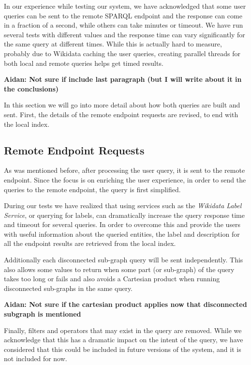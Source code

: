 In our experience while testing our system, we have acknowledged that some user queries can be sent to the remote SPARQL endpoint and the response can come in a fraction of a second, while others can take minutes or timeout. 
We have run several tests with different values and the response time can vary significantly for the same query at different times. While this is actually hard to measure, probably due to Wikidata caching the user queries, creating parallel threads for both local and remote queries helps get timed results.

\textbf{Aidan: Not sure if include last paragraph (but I will write about it in the conclusions)}

In this section we will go into more detail about how both queries are built and sent. First, the details of the remote endpoint requests are revised, to end with the local index.

\subsection{Remote Endpoint Requests}

As was mentioned before, after processing the user query, it is sent to the remote endpoint. Since the focus is on enriching the user experience, in order to send the queries to the remote endpoint, the query is first simplified.

During our tests we have realized that using services such as the \textit{Wikidata Label Service}, or querying for labels, can dramatically increase the query response time and timeout for several queries. In order to overcome this and provide the users with useful information about the queried entities, the label and description for all the endpoint results are retrieved from the local index.

Additionally each disconnected sub-graph query will be sent independently. This also allows some values to return when some part (or sub-graph) of the query takes too long or fails and also avoids a Cartesian product when running disconnected sub-graphs in the same query.

\textbf{Aidan: Not sure if the cartesian product applies now that disconnected subgraph is mentioned}

Finally, filters and operators that may exist in the query are removed. While we acknowledge that this has a dramatic impact on the intent of the query, we have considered that this could be included in future versions of the system, and it is not included for now.

